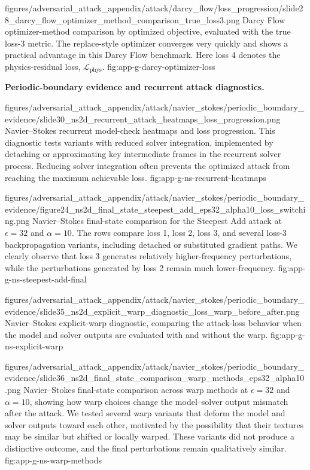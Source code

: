 \documentclass[letterpaper]{article} %
\newcounter{appendixsection}
\newcounter{appendixsubsection}[appendixsection]
\newcounter{appendixdomain}[appendixsubsection]
\begin{document}
\appendixattackfigstacked
  {figures/adversarial_attack_appendix/attack/darcy_flow/loss_progression/slide28_darcy_flow_optimizer_method_comparison_true_loss3.png}
  {Darcy Flow optimizer-method comparison by optimized objective, evaluated
  with the true loss-3 metric. The replace-style optimizer converges very
  quickly and shows a practical advantage in this Darcy Flow benchmark. Here
  loss 4 denotes the physics-residual loss, $\mathcal{L}_{\mathrm{phys}}$.}
  {fig:app-g-darcy-optimizer-loss}

\FloatBarrier
{}

\noindent\textbf{Periodic-boundary evidence and recurrent attack diagnostics.}

\appendixattackfigstacked
  {figures/adversarial_attack_appendix/attack/navier_stokes/periodic_boundary_evidence/slide30_ns2d_recurrent_attack_heatmaps_loss_progression.png}
  {Navier--Stokes recurrent model-check heatmaps and loss progression. This
  diagnostic tests variants with reduced solver integration, implemented by
  detaching or approximating key intermediate frames in the recurrent solver
  process. Reducing solver integration often prevents the optimized attack from
  reaching the maximum achievable loss.}
  {fig:app-g-ns-recurrent-heatmaps}

\appendixattackfigfullportrait
  {figures/adversarial_attack_appendix/attack/navier_stokes/periodic_boundary_evidence/figure24_ns2d_final_state_steepest_add_eps32_alpha10_loss_switching.png}
  {Navier--Stokes final-state comparison for the Steepest Add attack at
  $\epsilon=32$ and $\alpha=10$. The rows compare loss 1, loss 2, loss 3, and
  several loss-3 backpropagation variants, including detached or substituted
  gradient paths. We clearly observe that loss 3 generates relatively
  higher-frequency perturbations, while the perturbations generated by loss 2
  remain much lower-frequency.}
  {fig:app-g-ns-steepest-add-final}

\appendixattackfigportraitwidelarge
  {figures/adversarial_attack_appendix/attack/navier_stokes/periodic_boundary_evidence/slide35_ns2d_explicit_warp_diagnostic_loss_warp_before_after.png}
  {Navier--Stokes explicit-warp diagnostic, comparing the attack-loss behavior when
  the model and solver outputs are evaluated with and without the warp.}
  {fig:app-g-ns-explicit-warp}

\appendixattackfigportraitwidelarge
  {figures/adversarial_attack_appendix/attack/navier_stokes/periodic_boundary_evidence/slide36_ns2d_final_state_comparison_warp_methods_eps32_alpha10.png}
  {Navier--Stokes final-state comparison across warp methods at $\epsilon=32$
  and $\alpha=10$, showing how warp choices change the model--solver output
  mismatch after the attack. We tested several warp variants that deform the
  model and solver outputs toward each other, motivated by the possibility that
  their textures may be similar but shifted or locally warped. These variants
  did not produce a distinctive outcome, and the final perturbations remain
  qualitatively similar.}
  {fig:app-g-ns-warp-methods}
\end{document}
